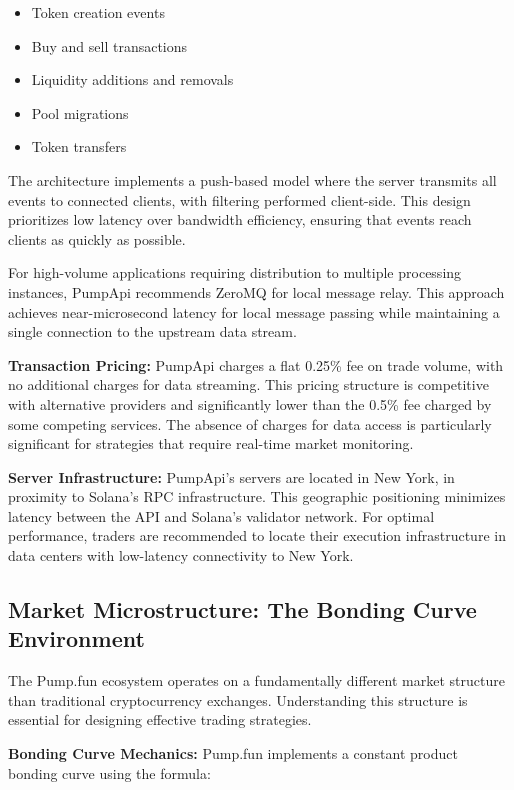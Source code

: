\documentclass[12pt,a4paper]{article}
\begin{document}
\begin{itemize}
\item Token creation events
\item Buy and sell transactions
\item Liquidity additions and removals
\item Pool migrations
\item Token transfers
\end{itemize}

The architecture implements a push-based model where the server transmits all events to connected clients, with filtering performed client-side. This design prioritizes low latency over bandwidth efficiency, ensuring that events reach clients as quickly as possible.

For high-volume applications requiring distribution to multiple processing instances, PumpApi recommends ZeroMQ for local message relay. This approach achieves near-microsecond latency for local message passing while maintaining a single connection to the upstream data stream.

\textbf{Transaction Pricing:} PumpApi charges a flat 0.25\% fee on trade volume, with no additional charges for data streaming. This pricing structure is competitive with alternative providers and significantly lower than the 0.5\% fee charged by some competing services. The absence of charges for data access is particularly significant for strategies that require real-time market monitoring.

\textbf{Server Infrastructure:} PumpApi's servers are located in New York, in proximity to Solana's RPC infrastructure. This geographic positioning minimizes latency between the API and Solana's validator network. For optimal performance, traders are recommended to locate their execution infrastructure in data centers with low-latency connectivity to New York.

\subsection{Market Microstructure: The Bonding Curve Environment}

The Pump.fun ecosystem operates on a fundamentally different market structure than traditional cryptocurrency exchanges. Understanding this structure is essential for designing effective trading strategies.

\textbf{Bonding Curve Mechanics:} Pump.fun implements a constant product bonding curve using the formula:
\end{document}
